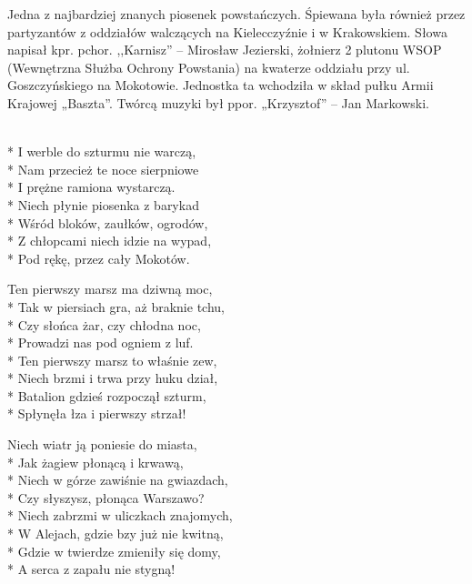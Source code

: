 \begin{info}Jedna z najbardziej znanych piosenek powstańczych. Śpiewana była również przez partyzantów z oddziałów walczących na Kielecczyźnie i w Krakowskiem. Słowa napisał kpr. pchor. ,,Karnisz'' – Mirosław Jezierski, żołnierz 2 plutonu WSOP (Wewnętrzna Służba Ochrony Powstania) na kwaterze oddziału przy ul. Goszczyńskiego na Mokotowie. Jednostka ta wchodziła w skład pułku Armii Krajowej „Baszta”. Twórcą muzyki był ppor. „Krzysztof” – Jan Markowski.\end{info}

\begin{lyrics}[longestline={\vin Ten pierwszy marsz niech dzień po dniu,}]

\\*
I werble do szturmu nie warczą,\\*
Nam przecież te noce sierpniowe\\*
I prężne ramiona wystarczą.\\*
\smallskip
Niech płynie piosenka z barykad\\*
Wśród bloków, zaułków, ogrodów,\\*
Z chłopcami niech idzie na wypad,\\*
Pod rękę, przez cały Mokotów.

\vin Ten pierwszy marsz ma dziwną moc,\\*
\vin Tak w piersiach gra, aż braknie tchu,\\*
\vin Czy słońca żar, czy chłodna noc,\\*
\vin Prowadzi nas pod ogniem z luf.\\*
\smallskip
\vin Ten pierwszy marsz to właśnie zew,\\*
\vin Niech brzmi i trwa przy huku dział,\\*
\vin Batalion gdzieś rozpoczął szturm,\\*
\vin Spłynęła łza i pierwszy strzał!

Niech wiatr ją poniesie do miasta,\\*
Jak żagiew płonącą i krwawą,\\*
Niech w górze zawiśnie na gwiazdach,\\*
Czy słyszysz, płonąca Warszawo?\\*
\smallskip
Niech zabrzmi w uliczkach znajomych,\\*
W Alejach, gdzie bzy już nie kwitną,\\*
Gdzie w twierdze zmieniły się domy,\\*
A serca z zapału nie stygną!


\end{lyrics}
